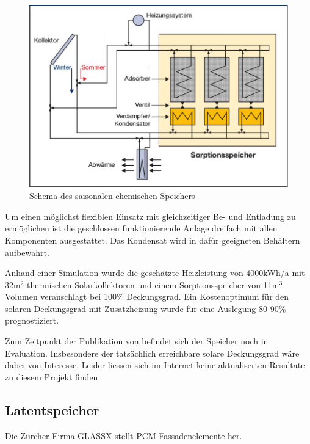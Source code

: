 \documentclass[11pt,a4paper]{scrartcl}
\begin{document}
\begin{figure}[h!]
\begin{center}
\includegraphics[scale=1]{images/energiehaus.jpg}
\caption{Schema des saisonalen chemischen Speichers \cite{BINE2}}
\label{fig:Saisonaler Speicher}
\end{center}
\end{figure}

Um einen möglichst flexiblen Einsatz mit gleichzeitiger Be- und Entladung zu
ermöglichen ist die geschlossen funktionierende Anlage dreifach mit allen
Komponenten ausgestattet. Das Kondensat wird in dafür geeigneten Behältern
aufbewahrt. 

Anhand einer Simulation wurde die geschätzte Heizleistung von
4000kWh/a mit 32m$^2$ thermischen Solarkollektoren und einem
Sorptionsspeicher von 11m$^3$ Volumen veranschlagt bei 100\% Deckungsgrad. Ein Kostenoptimum für den solaren
Deckungsgrad mit Zusatzheizung wurde für eine Auslegung 80-90\% prognostiziert.

Zum Zeitpunkt der Publikation von \cite{BINE2} befindet sich der Speicher noch
in Evaluation. Insbesondere der tatsächlich erreichbare solare Deckungsgrad wäre
dabei von Interesse. Leider liessen sich im Internet keine aktualiserten
Resultate zu diesem Projekt finden.
\subsection{Latentspeicher}
Die Zürcher Firma GLASSX stellt PCM Fassadenelemente her. 
\end{document}
